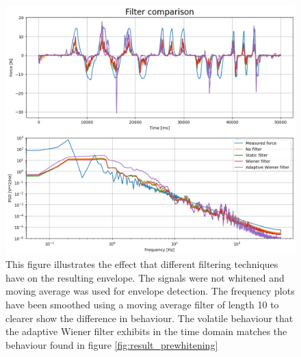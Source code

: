 \begin{figure}[h!t]
	\begin{center}
		\includegraphics[width=1.0\columnwidth]{images/measurement_filtering.png}
	\end{center}
	\caption{This figure illustrates the effect that different filtering techniques have on the resulting envelope. The signals were not whitened and moving average was used for envelope detection. The frequency plots have been smoothed using a moving average filter of length 10 to clearer show the difference in behaviour. The volatile behaviour that the adaptive Wiener filter exhibits in the time domain matches the behaviour found in figure \ref{fig:result_prewhitening}}
	\label{fig:result_filtering}
\end{figure}


